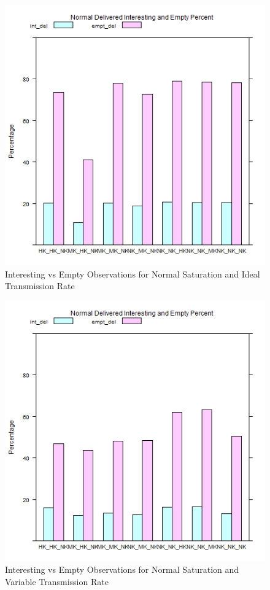 	\begin{figure}[H]
	\centering
	\includegraphics[width=\textwidth]{Chap7/figures/plots/normal_ideal/emptvsint_percent.png}
	\caption{Interesting vs Empty Observations for Normal Saturation and Ideal Transmission Rate}
	\label{fig:sim:res:norm:ideal:emptint}
	\end{figure}

	\begin{figure}[H]
	\centering
	\includegraphics[width=\textwidth]{Chap7/figures/plots/normal_variable/emptvsint_percent.png}
	\caption{Interesting vs Empty Observations for Normal Saturation and Variable Transmission Rate}
	\label{fig:sim:res:norm:variable:emptint}
	\end{figure}

